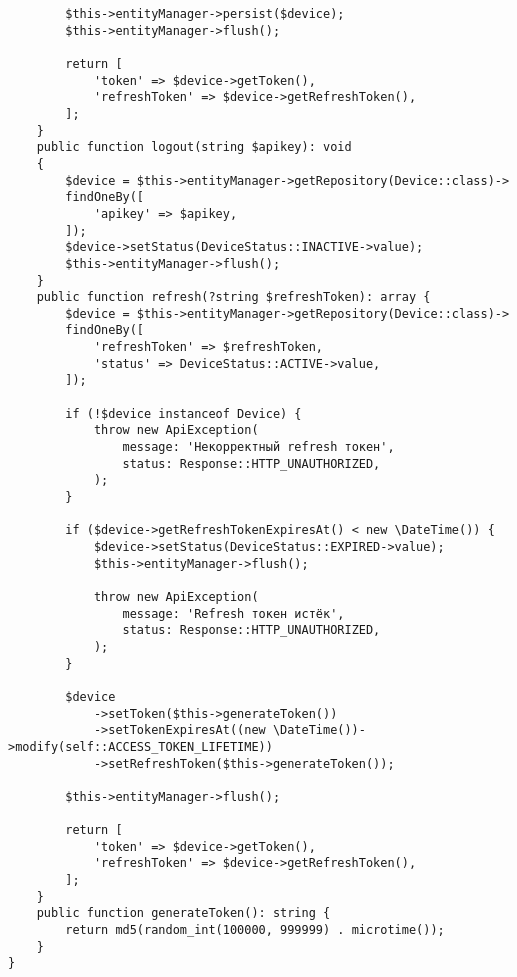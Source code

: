 \documentclass[pract]{SCWorks}
\begin{document}
\begin{verbatim}
        $this->entityManager->persist($device);
        $this->entityManager->flush();

        return [
            'token' => $device->getToken(),
            'refreshToken' => $device->getRefreshToken(),
        ];
    }
    public function logout(string $apikey): void
    {
        $device = $this->entityManager->getRepository(Device::class)->
        findOneBy([
            'apikey' => $apikey,
        ]);
        $device->setStatus(DeviceStatus::INACTIVE->value);
        $this->entityManager->flush();
    }
    public function refresh(?string $refreshToken): array {
        $device = $this->entityManager->getRepository(Device::class)->
        findOneBy([
            'refreshToken' => $refreshToken,
            'status' => DeviceStatus::ACTIVE->value,
        ]);

        if (!$device instanceof Device) {
            throw new ApiException(
                message: 'Некорректный refresh токен',
                status: Response::HTTP_UNAUTHORIZED,
            );
        }

        if ($device->getRefreshTokenExpiresAt() < new \DateTime()) {
            $device->setStatus(DeviceStatus::EXPIRED->value);
            $this->entityManager->flush();

            throw new ApiException(
                message: 'Refresh токен истёк',
                status: Response::HTTP_UNAUTHORIZED,
            );
        }

        $device
            ->setToken($this->generateToken())
            ->setTokenExpiresAt((new \DateTime())->modify(self::ACCESS_TOKEN_LIFETIME))
            ->setRefreshToken($this->generateToken());

        $this->entityManager->flush();

        return [
            'token' => $device->getToken(),
            'refreshToken' => $device->getRefreshToken(),
        ];
    }
    public function generateToken(): string {
        return md5(random_int(100000, 999999) . microtime());
    }
}
\end{verbatim}
\end{document}
